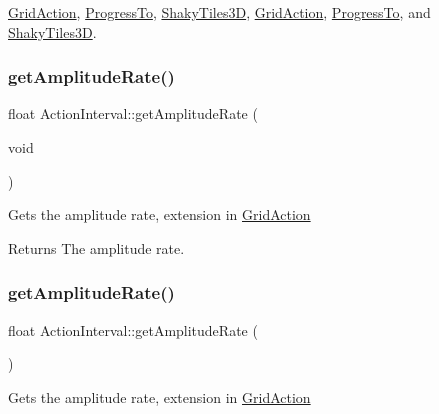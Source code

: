 \hyperlink{classGridAction_a081a9340e9289cf2dcbb6bde121d4f24}{Grid\+Action}, \hyperlink{classProgressTo_a993bf559112f3bbe3f4d38027711fd8e}{Progress\+To}, \hyperlink{classShakyTiles3D_aefe37a5cda9d6898ad9c573e5a220ce1}{Shaky\+Tiles3D}, \hyperlink{classGridAction_a081a9340e9289cf2dcbb6bde121d4f24}{Grid\+Action}, \hyperlink{classProgressTo_a55a418dbd387fca470d425df87291b0b}{Progress\+To}, and \hyperlink{classShakyTiles3D_ad83d154be5494000eb8fcfe657e503ff}{Shaky\+Tiles3D}.

\mbox{\label{classActionInterval_a376d54a39aef69cb640879c5ce1d589d}} 
\subsubsection{\texorpdfstring{get\+Amplitude\+Rate()}{getAmplitudeRate()}\hspace{0.1cm}{\footnotesize\ttfamily [1/2]}}
{\footnotesize\ttfamily float Action\+Interval\+::get\+Amplitude\+Rate (\begin{DoxyParamCaption}\item[{void}]{ }\end{DoxyParamCaption})}

Gets the amplitude rate, extension in \hyperlink{classGridAction}{Grid\+Action}

\begin{DoxyReturn}{Returns}
The amplitude rate. 
\end{DoxyReturn}
\mbox{\label{classActionInterval_a35494f8c4076e716d7bcd66cf0b46c93}} 
\subsubsection{\texorpdfstring{get\+Amplitude\+Rate()}{getAmplitudeRate()}\hspace{0.1cm}{\footnotesize\ttfamily [2/2]}}
{\footnotesize\ttfamily float Action\+Interval\+::get\+Amplitude\+Rate (\begin{DoxyParamCaption}{ }\end{DoxyParamCaption})}

Gets the amplitude rate, extension in \hyperlink{classGridAction}{Grid\+Action}

